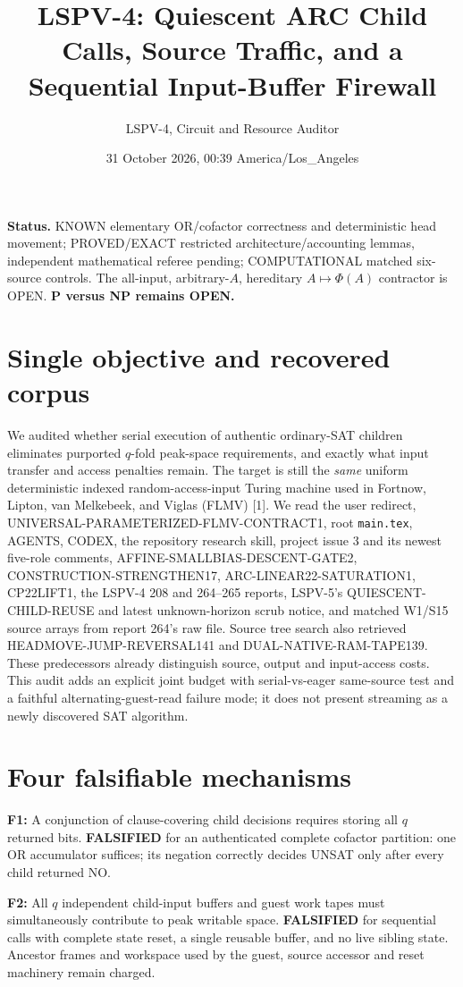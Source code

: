 \documentclass[11pt]{article}
\title{LSPV-4: Quiescent ARC Child Calls, Source Traffic, and a Sequential Input-Buffer Firewall}
\author{LSPV-4, Circuit and Resource Auditor}
\date{31 October 2026, 00:39 America/Los\_Angeles}
\begin{document}
\maketitle
\noindent\textbf{Status.} KNOWN elementary OR/cofactor correctness and deterministic head movement; PROVED/EXACT restricted architecture/accounting lemmas, independent mathematical referee pending; COMPUTATIONAL matched six-source controls. The all-input, arbitrary-$A$, hereditary $A\mapsto\Phi(A)$ contractor is OPEN. \textbf{P versus NP remains OPEN.}

\section{Single objective and recovered corpus}
We audited whether serial execution of authentic ordinary-SAT children eliminates purported $q$-fold peak-space requirements, and exactly what input transfer and access penalties remain. The target is still the \emph{same} uniform deterministic indexed random-access-input Turing machine used in Fortnow, Lipton, van Melkebeek, and Viglas (FLMV) [1]. We read the user redirect, UNIVERSAL-PARAMETERIZED-FLMV-CONTRACT1, root \texttt{main.tex}, AGENTS, CODEX, the repository research skill, project issue 3 and its newest five-role comments, AFFINE-SMALLBIAS-DESCENT-GATE2, CONSTRUCTION-STRENGTHEN17, ARC-LINEAR22-SATURATION1, CP22LIFT1, the LSPV-4 208 and 264--265 reports, LSPV-5's QUIESCENT-CHILD-REUSE and latest unknown-horizon scrub notice, and matched W1/S15 source arrays from report 264's raw file. Source tree search also retrieved HEADMOVE-JUMP-REVERSAL141 and DUAL-NATIVE-RAM-TAPE139. These predecessors already distinguish source, output and input-access costs. This audit adds an explicit joint budget with serial-vs-eager same-source test and a faithful alternating-guest-read failure mode; it does not present streaming as a newly discovered SAT algorithm.

\section{Four falsifiable mechanisms}
\noindent\textbf{F1:} A conjunction of clause-covering child decisions requires storing all $q$ returned bits. \textbf{FALSIFIED} for an authenticated complete cofactor partition: one OR accumulator suffices; its negation correctly decides UNSAT only after every child returned NO.

\noindent\textbf{F2:} All $q$ independent child-input buffers and guest work tapes must simultaneously contribute to peak writable space. \textbf{FALSIFIED} for sequential calls with complete state reset, a single reusable buffer, and no live sibling state. Ancestor frames and workspace used by the guest, source accessor and reset machinery remain charged.
\end{document}
